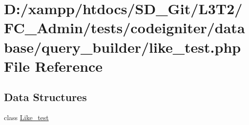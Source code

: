 \hypertarget{_admin_2tests_2codeigniter_2database_2query__builder_2like__test_8php}{}\section{D\+:/xampp/htdocs/\+S\+D\+\_\+\+Git/\+L3\+T2/\+F\+C\+\_\+\+Admin/tests/codeigniter/database/query\+\_\+builder/like\+\_\+test.php File Reference}
\label{_admin_2tests_2codeigniter_2database_2query__builder_2like__test_8php}
\subsection*{Data Structures}
\begin{DoxyCompactItemize}
\item 
class \hyperlink{class_like__test}{Like\+\_\+test}
\end{DoxyCompactItemize}
